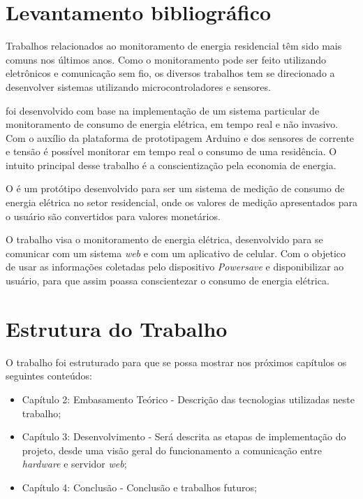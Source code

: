 \section{Levantamento bibliográfico}
Trabalhos relacionados ao monitoramento de energia residencial têm sido mais comuns nos últimos anos. Como o monitoramento pode ser feito utilizando eletrônicos e comunicação
sem fio, os diversos trabalhos tem se direcionado a desenvolver sistemas utilizando microcontroladores e sensores.


\cite{ref-jlgb} foi desenvolvido com base na implementação de um sistema particular de monitoramento de consumo de energia elétrica, em tempo real e não invasivo.
Com o auxílio da plataforma de prototipagem Arduino e dos sensores de corrente e tensão é possível monitorar em tempo real o consumo de uma residência. O intuito principal
desse trabalho é a conscientização pela economia de energia.

O \cite{ref-apc} é um protótipo desenvolvido para ser um sistema de medição de consumo de energia elétrica no setor residencial, onde os valores de medição
apresentados para o usuário são convertidos para valores monetários.


O trabalho \cite{ref-rpc} visa o monitoramento de energia elétrica, desenvolvido para se comunicar com um sistema \textit{web} e com um aplicativo de celular.
Com o objetico de usar as informações coletadas pelo dispositivo \textit{Powersave} e disponibilizar ao usuário, para que assim poassa conscientezar o consumo de energia elétrica.

\section{Estrutura do Trabalho}
O trabalho foi estruturado para que se possa mostrar nos próximos capítulos os seguintes conteúdos:
\begin{itemize}
	\item Capítulo 2: Embasamento Teórico - Descrição das tecnologias utilizadas neste trabalho;
	\item Capítulo 3: Desenvolvimento - Será descrita as etapas de implementação do projeto, desde uma visão geral do funcionamento a comunicação entre \textit{hardware} e servidor \textit{web};
	\item Capítulo 4: Conclusão - Conclusão e trabalhos futuros;
\end{itemize}